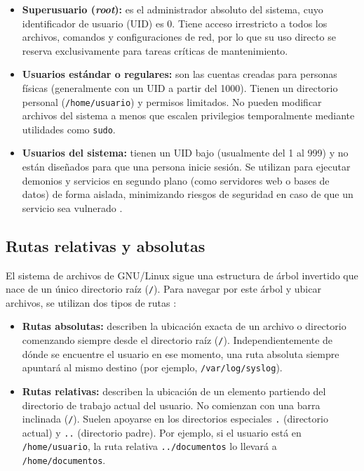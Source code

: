 \begin{itemize}[leftmargin=*]
    \item \textbf{Superusuario (\textit{root}):} es el administrador absoluto del sistema, cuyo identificador de usuario (UID) es 0. Tiene acceso irrestricto a todos los archivos, comandos y configuraciones de red, por lo que su uso directo se reserva exclusivamente para tareas críticas de mantenimiento.
    \item \textbf{Usuarios estándar o regulares:} son las cuentas creadas para personas físicas (generalmente con un UID a partir del 1000). Tienen un directorio personal (\texttt{/home/usuario}) y permisos limitados. No pueden modificar archivos del sistema a menos que escalen privilegios temporalmente mediante utilidades como \texttt{sudo}.
    \item \textbf{Usuarios del sistema:} tienen un UID bajo (usualmente del 1 al 999) y no están diseñados para que una persona inicie sesión. Se utilizan para ejecutar demonios y servicios en segundo plano (como servidores web o bases de datos) de forma aislada, minimizando riesgos de seguridad en caso de que un servicio sea vulnerado \cite{shotts:linux-command-line:2019}.
\end{itemize}

\subsection{Rutas relativas y absolutas}
\label{sec:prac01:rutas-teoria}
El sistema de archivos de GNU/Linux sigue una estructura de árbol invertido que nace de un único directorio raíz (\texttt{/}). Para navegar por este árbol y ubicar archivos, se utilizan dos tipos de rutas \cite{shotts:linux-command-line:2019}:

\begin{itemize}[leftmargin=*]
    \item \textbf{Rutas absolutas:} describen la ubicación exacta de un archivo o directorio comenzando siempre desde el directorio raíz (\texttt{/}). Independientemente de dónde se encuentre el usuario en ese momento, una ruta absoluta siempre apuntará al mismo destino (por ejemplo, \texttt{/var/log/syslog}).
    \item \textbf{Rutas relativas:} describen la ubicación de un elemento partiendo del directorio de trabajo actual del usuario. No comienzan con una barra inclinada (\texttt{/}). Suelen apoyarse en los directorios especiales \texttt{.} (directorio actual) y \texttt{..} (directorio padre). Por ejemplo, si el usuario está en \texttt{/home/usuario}, la ruta relativa \texttt{../documentos} lo llevará a \texttt{/home/documentos}.
\end{itemize}

